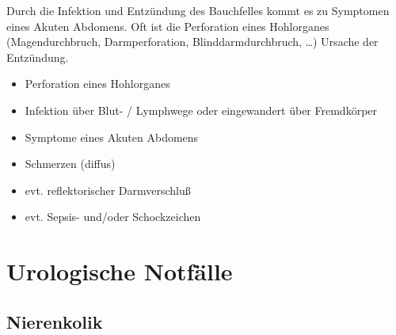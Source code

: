 \gMarried
{Durch die Infektion und Entzündung des Bauchfelles kommt es
zu Symptomen eines Akuten Abdomens. Oft ist die Perforation
eines Hohlorganes  (Magendurchbruch, Darmperforation,
Blinddarmdurchbruch, \ldots) Ursache der Entzündung. }
{

\begin{itemize}
\item Perforation eines Hohlorganes
\item Infektion über Blut- / Lymphwege oder eingewandert
über Fremdkörper
\end{itemize}


\begin{itemize}
\item Symptome eines Akuten Abdomens
\item Schmerzen (diffus)
\item evt. reflektorischer Darmverschluß
\item evt. Sepsis- und/oder Schockzeichen
\end{itemize}}







\section{Urologische Notfälle}


\subsection{Nierenkolik}




